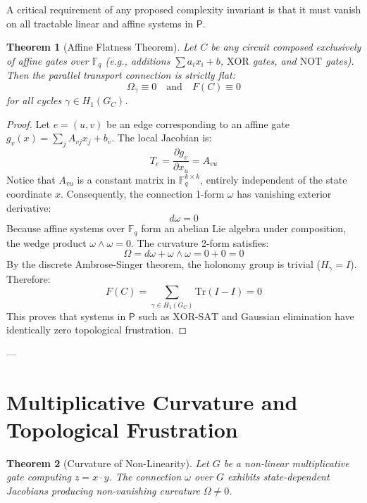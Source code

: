 \documentclass[11pt,a4paper]{article}
\newtheorem{theorem}{Theorem}[section]
\newcommand{\F}{\mathbb{F}}
\renewcommand{\P}{\mathsf{P}}
\newcommand{\Tr}{\mathrm{Tr}}
\begin{document}
A critical requirement of any proposed complexity invariant is that it must vanish on all tractable linear and affine systems in $\P$.

\begin{theorem}[Affine Flatness Theorem]\label{thm:affine_flatness}
Let $C$ be any circuit composed exclusively of affine gates over $\F_q$ (e.g., additions $\sum a_i x_i + b$, $\mathrm{XOR}$ gates, and $\mathrm{NOT}$ gates). Then the parallel transport connection is strictly flat:
\[
\Omega_\gamma \equiv 0 \quad \text{and} \quad F(C) \equiv 0
\]
for all cycles $\gamma \in H_1(G_C)$.
\end{theorem}

\begin{proof}
Let $e = (u,v)$ be an edge corresponding to an affine gate $g_v(x) = \sum_j A_{vj} x_j + b_v$. The local Jacobian is:
\[
T_e = \frac{\partial g_v}{\partial x_u} = A_{vu}
\]
Notice that $A_{vu}$ is a constant matrix in $\F_q^{k \times k}$, entirely independent of the state coordinate $x$. Consequently, the connection 1-form $\omega$ has vanishing exterior derivative:
\[
d\omega = 0
\]
Because affine systems over $\F_q$ form an abelian Lie algebra under composition, the wedge product $\omega \wedge \omega = 0$. The curvature 2-form satisfies:
\[
\Omega = d\omega + \omega \wedge \omega = 0 + 0 = 0
\]
By the discrete Ambrose-Singer theorem, the holonomy group is trivial ($H_\gamma = I$). Therefore:
\[
F(C) = \sum_{\gamma \in H_1(G_C)} \Tr(I - I) = 0
\]
This proves that systems in $\P$ such as $\mathrm{XOR\text{-}SAT}$ and Gaussian elimination have identically zero topological frustration.
\end{proof}

---

\section{Multiplicative Curvature and Topological Frustration}

\begin{theorem}[Curvature of Non-Linearity]\label{thm:multiplicative_curvature}
Let $G$ be a non-linear multiplicative gate computing $z = x \cdot y$. The connection $\omega$ over $G$ exhibits state-dependent Jacobians producing non-vanishing curvature $\Omega \neq 0$.
\end{theorem}
\end{document}
